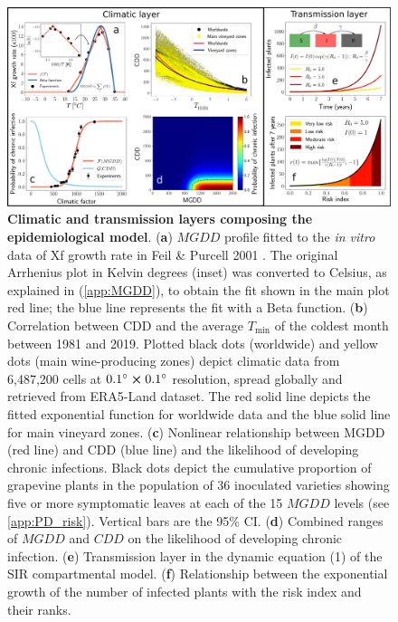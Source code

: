 \begin{figure}[t!]
    \centering
    \includegraphics[width=\textwidth]{Figures/Fig1.pdf}
    \caption[Climatic and transmission layers composing the
        epidemiological model]{\textbf{Climatic and transmission layers
            composing
            the
            epidemiological model}. (\textbf{a}) $MGDD$ profile fitted to the
        \textit{in
            vitro } data of Xf growth rate in Feil \& Purcell 2001
        \cite{Feil2001}. The
        original Arrhenius plot in Kelvin degrees (inset) was converted to
        Celsius, as
        explained in (\cref{app:MGDD}), to obtain the fit shown in the
        main
        plot red line; the blue line represents the fit with a Beta function.
        (\textbf{b}) Correlation between CDD and the average $T_{\textrm{min}}$
        of the
        coldest month between 1981 and 2019. Plotted black dots (worldwide) and
        yellow
        dots (main wine-producing zones) depict climatic data from 6,487,200
        cells at
        $\SI{0.1}{\degree} \cross \SI{0.1}{\degree}$ resolution, spread
        globally and
        retrieved from ERA5-Land dataset. The red solid line depicts the fitted
        exponential function for worldwide data and the blue solid line for
        main
        vineyard zones. (\textbf{c}) Nonlinear relationship between MGDD (red
        line) and
        CDD (blue line) and the likelihood of developing chronic infections.
        Black dots
        depict the cumulative proportion of grapevine plants in the population
        of $36$
        inoculated varieties showing five or more symptomatic leaves at each of
        the 15
        $MGDD$ levels (see \cref{app:PD_risk}). Vertical bars are the
        95\% CI.
        (\textbf{d}) Combined ranges of $MGDD$ and $CDD$ on the likelihood of
        developing chronic infection. (\textbf{e}) Transmission layer in the
        dynamic
        equation (1) of the SIR compartmental model. (\textbf{f}) Relationship
        between
        the exponential growth of the number of infected plants with the risk
        index and
        their ranks.}
    \label{fig1}
\end{figure}

